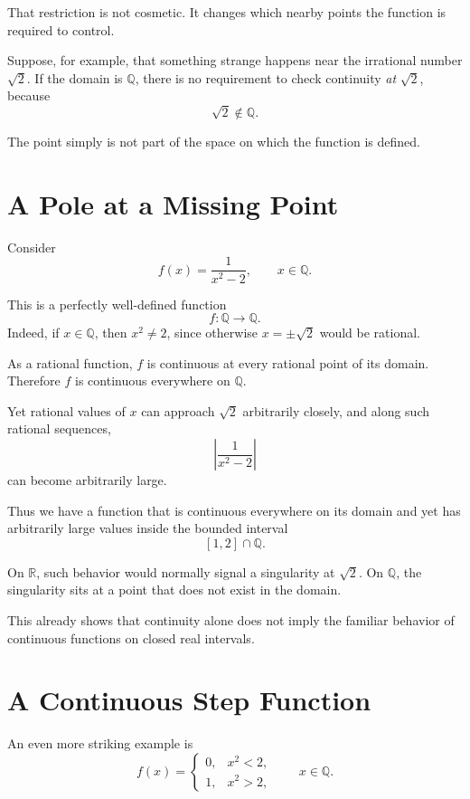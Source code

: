 \documentclass{essay}
\begin{document}
That restriction is not cosmetic. It changes which nearby points the function
is required to control.

Suppose, for example, that something strange happens near the irrational
number \(\sqrt{2}\). If the domain is \(\mathbb{Q}\), there is no requirement
to check continuity \emph{at} \(\sqrt{2}\), because
\[ \sqrt{2}\notin\mathbb{Q}. \]

The point simply is not part of the space on which the function is defined.

\section{A Pole at a Missing Point}

Consider
\[ f(x)=\frac{1}{x^{2}-2}, \qquad x\in\mathbb{Q}. \]

This is a perfectly well-defined function
\[ f:\mathbb{Q}\to\mathbb{Q}. \]
Indeed, if \(x\in\mathbb{Q}\), then \(x^{2}\neq 2\), since otherwise
\(x=\pm\sqrt{2}\) would be rational.

As a rational function, \(f\) is continuous at every rational point of its
domain. Therefore \(f\) is continuous everywhere on \(\mathbb{Q}\).

Yet rational values of \(x\) can approach \(\sqrt{2}\) arbitrarily closely,
and along such rational sequences,
\[ \left|\frac{1}{x^{2}-2}\right| \]
can become arbitrarily large.

Thus we have a function that is continuous everywhere on its domain and yet
has arbitrarily large values inside the bounded interval
\[ [1,2]\cap\mathbb{Q}. \]

On \(\mathbb{R}\), such behavior would normally signal a singularity at
\(\sqrt{2}\). On \(\mathbb{Q}\), the singularity sits at a point that does not
exist in the domain.

This already shows that continuity alone does not imply the familiar behavior
of continuous functions on closed real intervals.

\section{A Continuous Step Function}

An even more striking example is
\[
  f(x)=
  \begin{cases}
    0, & x^{2}<2,\\
    1, & x^{2}>2,
  \end{cases}
  \qquad x\in\mathbb{Q}.
\]
\end{document}
